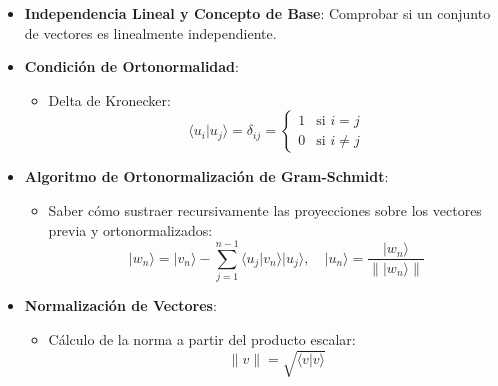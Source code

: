 \documentclass{article}
\begin{document}
\begin{itemize}
    \item \textbf{Independencia Lineal y Concepto de Base}: Comprobar si un conjunto de vectores es linealmente independiente.
    \item \textbf{Condición de Ortonormalidad}:
    \begin{itemize}
        \item Delta de Kronecker:
        \[
        \langle u_i|u_j\rangle = \delta_{ij} = 
        \begin{cases} 
        1 & \text{si } i = j \\ 
        0 & \text{si } i \neq j 
        \end{cases}
        \]
    \end{itemize}
    \item \textbf{Algoritmo de Ortonormalización de Gram-Schmidt}:
    \begin{itemize}
        \item Saber cómo sustraer recursivamente las proyecciones sobre los vectores previa y ortonormalizados:
        \[
        |w_n\rangle = |v_n\rangle - \sum_{j=1}^{n-1} \langle u_j|v_n\rangle |u_j\rangle, \quad |u_n\rangle = \frac{|w_n\rangle}{\||w_n\rangle\|}
        \]
    \end{itemize}
    \item \textbf{Normalización de Vectores}:
    \begin{itemize}
        \item Cálculo de la norma a partir del producto escalar:
        \[
        \|v\| = \sqrt{\langle v|v\rangle}
        \]
    \end{itemize}
\end{itemize}
\end{document}
